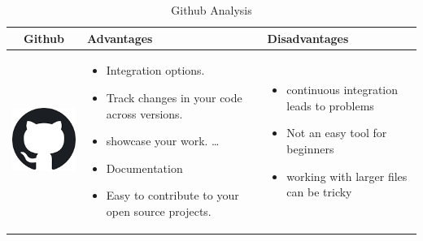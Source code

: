 \documentclass{article}
\begin{document}
			\begin{table}[h!]
				\centering
				\begin{tabular}{|c|m{5cm}|m{5cm}|}
					\hline
					Github & Advantages & Disadvantages \\
					\hline
					\begin{minipage}{0.25\textwidth}
						\includegraphics[width=\linewidth, height=30mm]{github.png}
					\end{minipage}
					& \begin{itemize}
						\item Integration options.
						\item Track changes in your code across versions.
						\item showcase your work. \ldots
						\item Documentation
						\item Easy to contribute to your open source projects.
					\end{itemize}
					& \begin{itemize}
						\item continuous integration leads to problems
						\item Not an easy tool for beginners
						\item working with larger files can be tricky
					\end{itemize} \\
					\hline
				\end{tabular}
				\caption{Github Analysis}
				\label{tbl:mygithub}
			\end{table}
		
\end{document}
